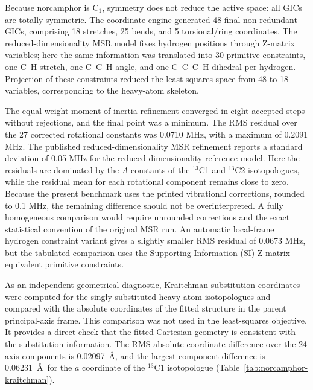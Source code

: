 \documentclass[journal=jctcce,manuscript=article,maxauthors=999]{achemso}
\begin{document}
Because norcamphor is C$_1$, symmetry does not reduce the active space:
all GICs are totally symmetric. The coordinate engine generated 48 final
non-redundant GICs, comprising 18 stretches, 25 bends, and 5 torsional/ring
coordinates. The reduced-dimensionality MSR model fixes hydrogen positions
through Z-matrix variables; here the same information was translated into 30
primitive constraints, one C--H stretch, one C--C--H angle, and one
C--C--C--H dihedral per hydrogen. Projection of these constraints reduced the
least-squares space from 48 to 18 variables, corresponding to the heavy-atom
skeleton.

The equal-weight moment-of-inertia refinement converged in eight accepted
steps without rejections, and the final point was a minimum. The RMS residual
over the 27 corrected rotational constants was 0.0710 MHz, with a maximum of
0.2091 MHz. The published reduced-dimensionality MSR refinement reports a
standard deviation of 0.05 MHz for the reduced-dimensionality
reference model. Here the residuals are
dominated by the $A$ constants of the $^{13}$C1 and $^{13}$C2 isotopologues,
while the residual mean for each rotational component remains close to zero.
Because the present benchmark uses the printed vibrational corrections,
rounded to 0.1 MHz, the remaining difference should not be overinterpreted. A
fully homogeneous comparison would require unrounded corrections and the exact
statistical convention of the original MSR run. An automatic local-frame
hydrogen constraint variant gives a slightly smaller RMS residual of
0.0673 MHz, but the tabulated comparison uses the Supporting Information (SI)
Z-matrix-equivalent
primitive constraints.

As an independent geometrical diagnostic, Kraitchman substitution coordinates
were computed for the singly substituted heavy-atom isotopologues and compared
with the absolute coordinates of the fitted structure in the parent
principal-axis frame. This comparison was not used in the least-squares
objective. It provides a direct check that the fitted Cartesian geometry is
consistent with the substitution information. The RMS absolute-coordinate
difference over the 24 axis components is 0.02097~\AA, and the largest
component difference is 0.06231~\AA\ for the $a$ coordinate of the
$^{13}$C1 isotopologue (Table~\ref{tab:norcamphor-kraitchman}).
\end{document}

